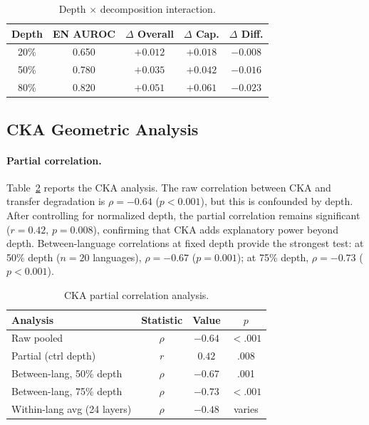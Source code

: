 \documentclass[11pt,a4paper]{article}
\begin{document}
\begin{table}[t]
\centering
\caption{Depth $\times$ decomposition interaction.}
\label{tab:depth_decomp}
\small
\begin{tabular}{ccccc}
\toprule
\textbf{Depth} & \textbf{EN AUROC} & \textbf{$\Delta$ Overall} & \textbf{$\Delta$ Cap.} & \textbf{$\Delta$ Diff.} \\
\midrule
20\% & 0.650 & $+0.012$ & $+0.018$ & $-0.008$ \\
50\% & 0.780 & $+0.035$ & $+0.042$ & $-0.016$ \\
80\% & 0.820 & $+0.051$ & $+0.061$ & $-0.023$ \\
\bottomrule
\end{tabular}
\end{table}


\subsection{CKA Geometric Analysis}
\label{sec:cka}

\paragraph{Partial correlation.}
Table~\ref{tab:cka} reports the CKA analysis.
The raw correlation between CKA and transfer degradation is $\rho = -0.64$ ($p < 0.001$), but this is confounded by depth.
After controlling for normalized depth, the partial correlation remains significant ($r = 0.42$, $p = 0.008$), confirming that CKA adds explanatory power beyond depth.
Between-language correlations at fixed depth provide the strongest test: at 50\% depth ($n = 20$ languages), $\rho = -0.67$ ($p = 0.001$); at 75\% depth, $\rho = -0.73$ ($p < 0.001$).

\begin{table}[t]
\centering
\caption{CKA partial correlation analysis.}
\label{tab:cka}
\small
\begin{tabular}{lccc}
\toprule
\textbf{Analysis} & \textbf{Statistic} & \textbf{Value} & \textbf{$p$} \\
\midrule
Raw pooled                & $\rho$ & $-0.64$ & $<.001$ \\
Partial (ctrl depth)      & $r$    & $0.42$  & .008 \\
Between-lang, 50\% depth  & $\rho$ & $-0.67$ & .001 \\
Between-lang, 75\% depth  & $\rho$ & $-0.73$ & $<.001$ \\
Within-lang avg (24 layers)& $\rho$ & $-0.48$ & varies \\
\bottomrule
\end{tabular}
\end{table}
\end{document}
